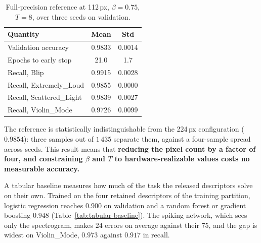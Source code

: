 \begin{table}[htbp]
\centering
\begin{tabular}{lcc}
\toprule
Quantity & Mean & Std \\
\midrule
Validation accuracy & 0.9833 & 0.0014 \\
Epochs to early stop & 21.0 & 1.7 \\
Recall, Blip & 0.9915 & 0.0028 \\
Recall, Extremely\_Loud & 0.9855 & 0.0000 \\
Recall, Scattered\_Light & 0.9839 & 0.0027 \\
Recall, Violin\_Mode & 0.9726 & 0.0099 \\
\bottomrule
\end{tabular}
\caption{Full-precision reference at 112\,px, $\beta = 0.75$, $T = 8$, over three
seeds on validation.}
\label{tab:fp32}
\end{table}

The reference is statistically indistinguishable from the 224\,px configuration
($0.9854$): three samples out of $1\,435$ separate them, against a four-sample
spread across seeds. This result means that \textbf{reducing the pixel count by a factor of four, and
constraining $\beta$ and $T$ to hardware-realizable values costs no measurable
accuracy.}

A tabular baseline measures how much of the task the released descriptors solve
on their own. Trained on the four retained descriptors of the training partition,
logistic regression reaches $0.900$ on validation and a random forest or gradient
boosting $0.948$ (Table~\ref{tab:tabular-baseline}). The spiking network, which
sees only the spectrogram, makes $24$ errors on average against their $75$, and
the gap is widest on Violin\_Mode, $0.973$ against $0.917$ in recall.
 
\begin{table}[htbp]
\centering
\small
{}
\caption{Tabular baseline on the four retained descriptors (duration, peak
frequency, SNR and bandwidth, with $\log(1+x)$ of duration and SNR), trained on
the training partition and evaluated on validation over three seeds: accuracy,
per-class recall and errors out of $1\,435$. The random-forest accuracy ranges
over $0.9470$--$0.9484$ across seeds; the other models do not vary.}
\label{tab:tabular-baseline}
\end{table}

